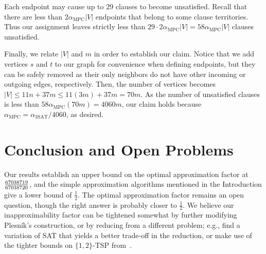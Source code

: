 \documentclass[11pt]{article}
\def\MPC{\mathrm{MPC}}
\def\SAT{\mathrm{3SAT}}
\begin{document}
Each endpoint may cause up to $29$ clauses to become unsatisfied. Recall that there are less than $2\alpha_{\MPC}|V|$ endpoints that belong to some clause territories. Thus our assignment leaves strictly less than $29\cdot2\alpha_{\MPC}|V|=58\alpha_{\MPC}|V|$ clauses unsatisfied.

Finally, we relate $|V|$ and $m$ in order to establish our claim. Notice that we add vertices $s$ and $t$ to our graph for convenience when defining endpoints, but they can be safely removed as their only neighbors do not have other incoming or outgoing edges, respectively. Then, the number of vertices becomes $|V| \leq 11n + 37m \leq 11(3m) + 37m = 70m$. As the number of unsatisfied clauses is less than $58\alpha_{\MPC}(70m)=4060m$, our claim holds because $\alpha_{\MPC} = \alpha_{\SAT}/4060$, as desired.

\section{Conclusion and Open Problems} \label{sec:open}

Our results establish an upper bound on the optimal approximation factor at ${67038719 \over 67038720}$,
and the simple approximation algorithms mentioned
in the Introduction give a lower bound of $\frac{1}{2}$.  The optimal
approximation factor remains an open question, though the right answer is
probably closer to $\frac{1}{2}$.
We believe our inapproximability factor can be tightened somewhat by
further modifying Plesn\'ik's construction, or by reducing from a different problem; e.g.,
find a variation of \textsc{SAT} that yields a better trade-off in the reduction,
or make use of the tighter bounds on \textsc{$\{1,2\}$-TSP} from~\cite{Enge03}.

\end{document}

